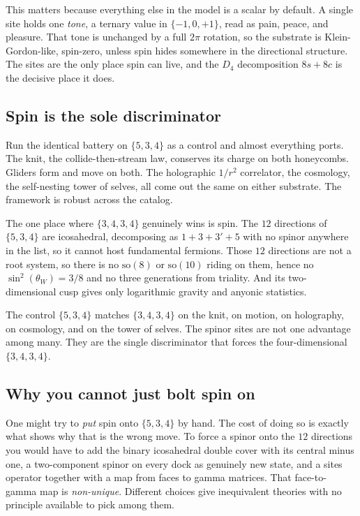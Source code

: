 This matters because everything else in the model is a scalar by default. A single site holds one \emph{tone}, a ternary value in $\{-1, 0, +1\}$, read as pain, peace, and pleasure. That tone is unchanged by a full $2\pi$ rotation, so the substrate is Klein-Gordon-like, spin-zero, unless spin hides somewhere in the directional structure. The sites are the only place spin can live, and the $D_4$ decomposition $8s + 8c$ is the decisive place it does.

\subsection{Spin is the sole discriminator}

Run the identical battery on $\{5,3,4\}$ as a control and almost everything ports. The knit, the collide-then-stream law, conserves its charge on both honeycombs. Gliders form and move on both. The holographic $1/r^2$ correlator, the cosmology, the self-nesting tower of selves, all come out the same on either substrate. The framework is robust across the catalog.

The one place where $\{3,4,3,4\}$ genuinely wins is spin. The $12$ directions of $\{5,3,4\}$ are icosahedral, decomposing as $1 + 3 + 3' + 5$ with no spinor anywhere in the list, so it cannot host fundamental fermions. Those $12$ directions are not a root system, so there is no $\mathrm{so}(8)$ or $\mathrm{so}(10)$ riding on them, hence no $\sin^2(\theta_W) = 3/8$ and no three generations from triality. And its two-dimensional cusp gives only logarithmic gravity and anyonic statistics.

\begin{result}
The control $\{5,3,4\}$ matches $\{3,4,3,4\}$ on the knit, on motion, on holography, on cosmology, and on the tower of selves. The spinor sites are not one advantage among many. They are the single discriminator that forces the four-dimensional $\{3,4,3,4\}$.
\end{result}

\subsection{Why you cannot just bolt spin on}

One might try to \emph{put} spin onto $\{5,3,4\}$ by hand. The cost of doing so is exactly what shows why that is the wrong move. To force a spinor onto the $12$ directions you would have to add the binary icosahedral double cover with its central minus one, a two-component spinor on every dock as genuinely new state, and a sites operator together with a map from faces to gamma matrices. That face-to-gamma map is \emph{non-unique}. Different choices give inequivalent theories with no principle available to pick among them.

